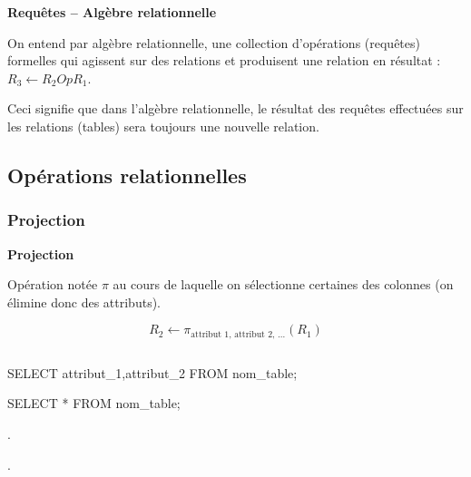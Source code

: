 \documentclass[10pt,fleqn]{article} %
\begin{document}
\begin{defi}
\textbf{Requêtes -- Algèbre relationnelle}

On entend par algèbre relationnelle, une collection d'opérations (requêtes) formelles qui agissent sur des relations et produisent une relation en résultat : $R_3 \leftarrow R_2 Op R_1$.
\end{defi}

Ceci signifie que dans l'algèbre relationnelle, le résultat des requêtes effectuées sur les relations (tables) sera toujours une nouvelle relation. 
%
%
%
%


\subsection{Opérations relationnelles}
\subsubsection{Projection}

\begin{defi}

\textbf{Projection}

Opération notée $\pi$ au cours de laquelle on sélectionne certaines des colonnes (on élimine donc des attributs). 
\ifprof

$$
 R_2 \leftarrow \pi_{\text{attribut 1, attribut 2, ...}}(R_1)
$$

\else
$$ \quad $$
$$ \quad $$
\fi

\ifprof
\begin{envsql}
\begin{sql}
SELECT attribut_1,attribut_2 FROM nom_table;

SELECT * FROM nom_table;
\end{sql}
\end{envsql}
\else
\begin{envsql}
\begin{sql}
. 
 

.
\end{sql}
\end{envsql}
\fi
\end{defi}
\end{document}
